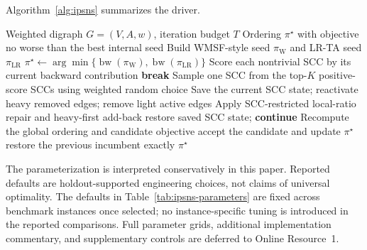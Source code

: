 Algorithm~\ref{alg:ipsns} summarizes the driver.

\begin{algorithm}[t]
\caption{IPSNS with incumbent protection}
\label{alg:ipsns}
\footnotesize
\begin{algorithmic}[1]
\Require Weighted digraph \(G=(V,A,w)\), iteration budget \(T\)
\Ensure Ordering \(\pi^\star\) with objective no worse than the best internal seed
\State Build WMSF-style seed \(\pi_{\mathrm{W}}\) and LR-TA seed \(\pi_{\mathrm{LR}}\)
\State \(\pi^\star \gets \arg\min\{\operatorname{bw}(\pi_{\mathrm{W}}),\operatorname{bw}(\pi_{\mathrm{LR}})\}\)
    \State Score each nontrivial SCC by its current backward contribution
        \State \textbf{break}
    \EndIf
    \State Sample one SCC from the top-\(K\) positive-score SCCs using weighted random choice
    \State Save the current SCC state; reactivate heavy removed edges; remove light active edges
    \State Apply SCC-restricted local-ratio repair and heavy-first add-back
        \State restore saved SCC state; \textbf{continue}
    \EndIf
    \State Recompute the global ordering and candidate objective
        \State accept the candidate and update \(\pi^\star\)
    \Else
        \State restore the previous incumbent exactly
    \EndIf
\EndFor
\State \Return \(\pi^\star\)
\end{algorithmic}
\end{algorithm}

The parameterization is interpreted conservatively in this paper. Reported defaults are holdout-supported engineering choices, not claims of universal optimality. The defaults in Table~\ref{tab:ipsns-parameters} are fixed across benchmark instances once selected; no instance-specific tuning is introduced in the reported comparisons. Full parameter grids, additional implementation commentary, and supplementary controls are deferred to Online Resource~1.


